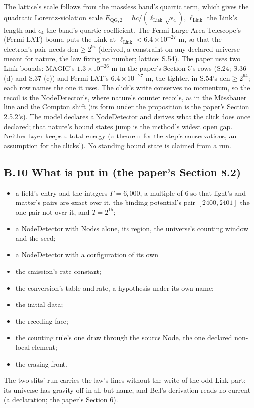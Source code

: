 \documentclass[pdflatex,sn-mathphys-num]{sn-jnl}
\newcommand{\den}{\mathrm{den}}
\theoremstyle{thmstyleone}
\begin{document}
The lattice's scale follows from the massless band's quartic term, which gives the quadratic Lorentz-violation scale $E_{\mathrm{QG},2} = \hbar c / (\ell_{\mathrm{Link}}\sqrt{\epsilon_4})$, $\ell_{\mathrm{Link}}$ the Link's length and $\epsilon_4$ the band's quartic coefficient. The Fermi Large Area Telescope's (Fermi-LAT) bound \cite{vasileiou} puts the Link at $\ell_{\mathrm{Link}} < 6.4 \times 10^{-27}$ m, so that the electron's pair needs $\den \ge 2^{94}$ (derived, a constraint on any declared universe meant for nature, the law fixing no number; lattice; S.54). The paper uses two Link bounds: MAGIC's $1.3 \times 10^{-26}$ m in the paper's Section 5's rows (S.24; S.36 (d) and S.37 (c)) and Fermi-LAT's $6.4 \times 10^{-27}$ m, the tighter, in S.54's $\den \ge 2^{94}$; each row names the one it uses. The click's write conserves no momentum, so the recoil is the NodeDetector's, where nature's counter recoils, as in the M\"ossbauer line \cite{mossbauer} and the Compton shift (its form under the proposition is the paper's Section 2.5.2's). The model declares a NodeDetector and derives what the click does once declared; that nature's bound states jump \cite{cook}\cite{bergquist} is the method's widest open gap. Neither layer keeps a total energy (a theorem for the step's conservations, an assumption for the clicks'). No standing bound state is claimed from a run.

\subsection*{B.10 What is put in (the paper's Section 8.2)}

\begin{itemize}
\item a field's entry and the integers $\Gamma = 6{,}000$, a multiple of $6$ so that light's and matter's pairs are exact over it, the binding potential's pair $[2400, 2401]$ the one pair not over it, and $T = 2^{15}$;
\item a NodeDetector with Nodes alone, its region, the universe's counting window and the seed;
\item a NodeDetector with a configuration of its own;
\item the emission's rate constant;
\item the conversion's table and rate, a hypothesis under its own name;
\item the initial data;
\item the receding face;
\item the counting rule's one draw through the source Node, the one declared non-local element;
\item the erasing front.
\end{itemize}
The two slits' run carries the law's lines without the write of the odd Link part: its universe has gravity off in all but name, and Bell's derivation reads no current (a declaration; the paper's Section 6).
\end{document}
